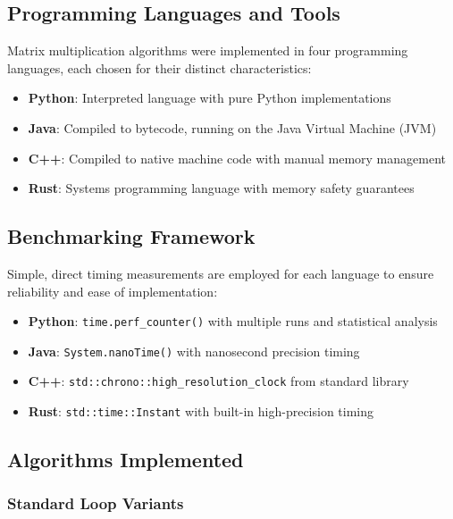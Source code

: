 \documentclass[11pt,a4paper]{article}
\begin{document}
\subsection{Programming Languages and Tools}

Matrix multiplication algorithms were implemented in four programming languages, each chosen for their distinct characteristics:

\begin{itemize}
    \item \textbf{Python}: Interpreted language with pure Python implementations
    \item \textbf{Java}: Compiled to bytecode, running on the Java Virtual Machine (JVM)
    \item \textbf{C++}: Compiled to native machine code with manual memory management
    \item \textbf{Rust}: Systems programming language with memory safety guarantees
\end{itemize}

\subsection{Benchmarking Framework}

Simple, direct timing measurements are employed for each language to ensure reliability and ease of implementation:

\begin{itemize}
    \item \textbf{Python}: \texttt{time.perf\_counter()} with multiple runs and statistical analysis
    \item \textbf{Java}: \texttt{System.nanoTime()} with nanosecond precision timing
    \item \textbf{C++}: \texttt{std::chrono::high\_resolution\_clock} from standard library
    \item \textbf{Rust}: \texttt{std::time::Instant} with built-in high-precision timing
\end{itemize}

\subsection{Algorithms Implemented}

\subsubsection{Standard Loop Variants}
\end{document}
